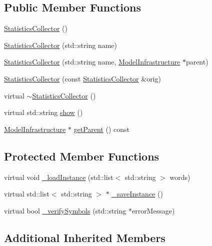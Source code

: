 \subsection*{Public Member Functions}
\begin{DoxyCompactItemize}
\item 
\hyperlink{class_statistics_collector_a2129c2bd19f9d64814fbfe18974a6d2e}{Statistics\+Collector} ()
\item 
\hyperlink{class_statistics_collector_acbb20e7e94252ff7105de7b0cdecb7ee}{Statistics\+Collector} (std\+::string name)
\item 
\hyperlink{class_statistics_collector_a9c51fc17337d3c050ff7e650825cccf9}{Statistics\+Collector} (std\+::string name, \hyperlink{class_model_infrastructure}{Model\+Infrastructure} $\ast$parent)
\item 
\hyperlink{class_statistics_collector_a25e8def6d91decdf48d7c0fedb4382dc}{Statistics\+Collector} (const \hyperlink{class_statistics_collector}{Statistics\+Collector} \&orig)
\item 
virtual \hyperlink{class_statistics_collector_aef9244a0c9f715bc19136d283b759c6e}{$\sim$\+Statistics\+Collector} ()
\item 
virtual std\+::string \hyperlink{class_statistics_collector_a7ce8dad7e29d06c73a01d2ddee93fe00}{show} ()
\item 
\hyperlink{class_model_infrastructure}{Model\+Infrastructure} $\ast$ \hyperlink{class_statistics_collector_a8364c0ffd6fa0ffddc6ab2290ef8d184}{get\+Parent} () const 
\end{DoxyCompactItemize}
\subsection*{Protected Member Functions}
\begin{DoxyCompactItemize}
\item 
virtual void \hyperlink{class_statistics_collector_aa13d2bc6d9deeffa9667388ae3e4f962}{\+\_\+load\+Instance} (std\+::list$<$ std\+::string $>$ words)
\item 
virtual std\+::list$<$ std\+::string $>$ $\ast$ \hyperlink{class_statistics_collector_a66eed8e1bd0316588575aa7310ac028b}{\+\_\+save\+Instance} ()
\item 
virtual bool \hyperlink{class_statistics_collector_a5aeefa5028a2b6a0157db55c0dfc7419}{\+\_\+verify\+Symbols} (std\+::string $\ast$error\+Message)
\end{DoxyCompactItemize}
\subsection*{Additional Inherited Members}


